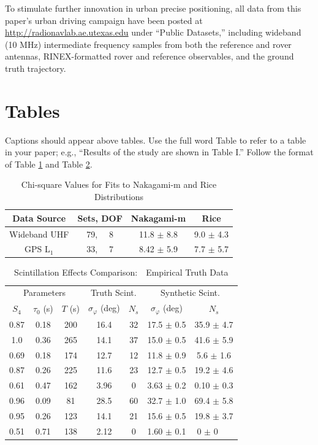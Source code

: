 \documentclass[10pt,journal,twocolumn]{IEEEtran} %
\begin{document}
To stimulate further innovation in urban precise positioning, all data from
this paper's urban driving campaign have been posted at
\url{http://radionavlab.ae.utexas.edu} under ``Public Datasets,'' including
wideband (10 MHz) intermediate frequency samples from both the reference and
rover antennas, RINEX-formatted rover and reference observables, and the
ground truth trajectory.

\section{Tables}
Captions should appear above tables.  Use the full word Table to refer to a
table in your paper; e.g., ``Results of the study are shown in Table I.''
Follow the format of Table \ref{tab:Chi2Fits} and Table
\ref{tab:ValidationTable2}.

\begin{table}[ht]
  \centering
  \caption{Chi-square Values for Fits to Nakagami-m and Rice Distributions}
  \begin{tabular}[c]{cccc}
    \toprule
    Data Source &  Sets, DOF & Nakagami-m & Rice \\ \midrule
    Wideband UHF & 79, ~~8 & 11.8 $\pm$ 8.8 & 9.0 $\pm$ 4.3 \\
    GPS L$_1$ & 33, ~~7 & 8.42 $\pm$ 5.9 & 7.7 $\pm$ 5.7 \\ \bottomrule
  \end{tabular}
  \label{tab:Chi2Fits}  
\end{table}

\begin{table}[ht]
  \centering
  \caption{Scintillation Effects Comparison:~~Empirical Truth Data}
  \begin{tabular}[c]{ccccccc}
    \toprule
    \multicolumn{3}{c}{Parameters}  
    & \multicolumn{2}{c}{Truth Scint.} 
    & \multicolumn{2}{c}{Synthetic Scint.} \\
    \cmidrule(r){1-3} \cmidrule(r){4-5} \cmidrule(r){6-7}
    $S_4$& $\tau_0$ (s) & $T$ (s) & $\sigma_{\varphi}$ (deg) 
    & $N_s$ & $\sigma_{\varphi}$ (deg) & $N_s$ \\  \midrule
    0.87 & 0.18 & 200 & 16.4 & 32 & 17.5 $\pm$ 0.5 & 35.9 $\pm$ 4.7 \\ 
    1.0 & 0.36 & 265 & 14.1 & 37 & 15.0 $\pm$ 0.5 & 41.6 $\pm$ 5.9 \\  
    0.69 & 0.18 & 174 & 12.7 & 12 & 11.8 $\pm$ 0.9 & 5.6 $\pm$ 1.6 \\ 
    0.87 & 0.26 & 225 & 11.6 & 23 & 12.7 $\pm$ 0.5 & 19.2 $\pm$ 4.6 \\
    0.61 & 0.47 & 162 & 3.96 & 0 & 3.63 $\pm$ 0.2 & 0.10 $\pm$ 0.3 \\
    0.96 & 0.09 & 81 & 28.5 & 60 & 32.7 $\pm$ 1.0 & 69.4 $\pm$ 5.8 \\
    0.95 & 0.26 & 123 & 14.1 & 21 & 15.6 $\pm$ 0.5 & 19.8 $\pm$ 3.7 \\
    0.51 & 0.71 & 138 & 2.12 & 0 & 1.60 $\pm$ 0.1 & 0 $\pm$ 0~~~ \\
    \bottomrule
  \end{tabular}
  \label{tab:ValidationTable2}  
\end{table}
\end{document}

